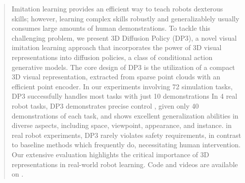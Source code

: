 \begin{abstract}

Imitation learning provides an efficient way to teach robots dexterous skills; however, learning complex skills robustly and generalizablely usually consumes large amounts of human demonstrations. To tackle this challenging problem, we present 3D Diffusion Policy (DP3), a novel visual imitation learning approach that incorporates the power of 3D visual representations into diffusion policies, a class of conditional action generative models. The core design of DP3 is the utilization of a compact 3D visual representation, extracted from sparse point clouds with an efficient point encoder. In our experiments involving 72 simulation tasks, DP3 successfully handles most tasks with just 10 demonstrations  In 4 real robot tasks, DP3 demonstrates precise control , given only 40 demonstrations of each task, and shows excellent generalization abilities in diverse aspects, including space, viewpoint, appearance, and instance.   in real robot experiments, DP3 rarely violates safety requirements, in contrast to baseline methods which frequently do, necessitating human intervention. Our extensive evaluation highlights the critical importance of 3D representations in real-world robot learning. Code and videos are available on \ourwebsite.

\end{abstract}
